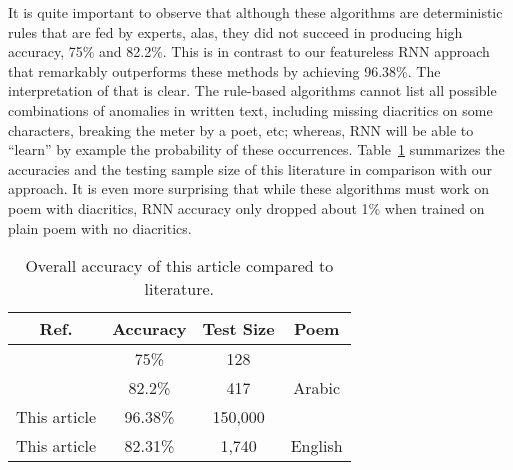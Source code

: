 \bigskip

It is quite important to observe that although these algorithms are deterministic rules that are fed
by experts, alas, they did not succeed in producing high accuracy, 75\% and 82.2\%. This is in
contrast to our featureless RNN approach that remarkably outperforms these methods by achieving
96.38\%. The interpretation of that is clear. The rule-based algorithms cannot list all possible
combinations of anomalies in written text, including missing diacritics on some characters, breaking
the meter by a poet, etc; whereas, RNN will be able to ``learn'' by example the probability of these
occurrences. Table~\ref{tab:summ-results} summarizes the accuracies and the testing sample size of
this literature in comparison with our approach. It is even more surprising that while these
algorithms must work on poem with diacritics, RNN accuracy only dropped about 1\% when trained on
plain poem with no diacritics.

\begin{table}[!tb]
  \centering
  \begin{tabular}{c c c c}
    \toprule
    \textbf{Ref.}& \textbf{Accuracy}& \textbf{Test Size} & \textbf{Poem}\\
    \midrule
    \cite{Alnagdawi2013FindingArabicPoemMeter}   & 75\%     & 128     & \multirow{3}{*}{Arabic}\\
    \cite{Abuata2016RuleBasedAlgorithmFor}      & 82.2\%   & 417     & \\
    This article   & 96.38\%  & 150,000 & \\
    \midrule
    This article   & 82.31\%  &  1,740  & English\\
    \bottomrule
  \end{tabular}
  \caption{Overall accuracy of this article compared to literature.}\label{tab:summ-results}
\end{table}
